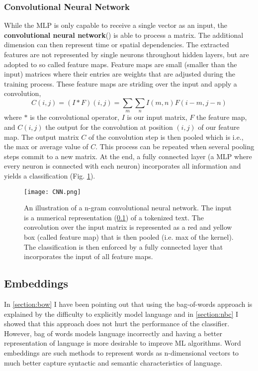 \subsubsection{Convolutional Neural Network}
While the MLP is only capable to receive a single vector as an input, the \textbf{convolutional neural network}() is able to process a matrix. The additional dimension can then represent time or spatial dependencies. The extracted features are not represented by single neurons throughout hidden layers, but are adopted to so called feature maps. Feature maps are small (smaller than the input) matrices where their entries are weights that are adjusted during the training process. These feature maps are striding over the input and apply a convolution,
\[C(i,j) = (I \ast F)(i,j) = \sum_m \sum_n I(m, n) F(i-m, j-n)\] where $\ast$ is the convolutional operator, $I$ is our input matrix, $F$ the feature map, and $C(i,j)$ the output for the convolution at position $(i,j)$ of our feature map. The output matrix $C$ of the convolution step is then pooled which is i.e., the max or average value of $C$. This process can be repeated when several pooling steps commit to a new matrix. At the end, a fully connected layer (a MLP where every neuron is connected with each neuron) incorporates all information and yields a classification (Fig. \ref{fig:cnn}).
\begin{figure}[h!]
    \centering
    \texttt{[image: CNN.png]}
    \caption{An illustration of a n-gram convolutional neural network. The input is a numerical representation (\ref{section:embeddings}) of a tokenized text. The convolution over the input matrix is represented as a red and yellow box (called feature map) that is then pooled (i.e. max of the kernel). The classification is then enforced by a fully connected layer that incorporates the input of all feature maps.}
    \label{fig:cnn}
\end{figure}

\subsection{Embeddings}\label{section:embeddings}

In \ref{section:bow} I have been pointing out that using the bag-of-words approach is explained by the difficulty to explicitly model language and in \ref{section:nbc} I showed that this approach does not hurt the performance of the classifier. However, bag of words models language incorrectly and having a better representation of language is more desirable to improve ML algorithms. Word embeddings are such methods to represent words as n-dimensional vectors to much better capture syntactic and semantic characteristics of language.


